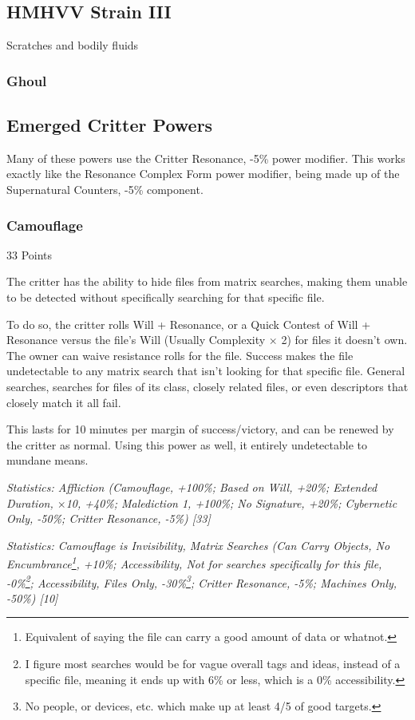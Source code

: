 \begin{multicols*}{3}
	\subsection*{HMHVV Strain III}
	
	Scratches and bodily fluids
	
	\subsubsection{Ghoul}
	
	\subsection{Emerged Critter Powers}
	
	Many of these powers use the Critter Resonance, -5\% power modifier. This works exactly like the Resonance Complex Form power modifier, being made up of the Supernatural Counters, -5\% component.
	
	\subsubsection{Camouflage}\label{camouflage}
	\begin{flushright}
		33 Points
	\end{flushright}

	The critter has the ability to hide files from matrix searches, making them unable to be detected without specifically searching for that specific file.
	
	To do so, the critter rolls Will + Resonance, or a Quick Contest of Will + Resonance versus the file's Will (Usually Complexity $\times$ 2) for files it doesn't own. The owner can waive resistance rolls for the file. Success makes the file undetectable to any matrix search that isn't looking for that specific file. General searches, searches for files of its class, closely related files, or even descriptors that closely match it all fail.
	
	This lasts for 10 minutes per margin of success/victory, and can be renewed by the critter as normal. Using this power as well, it entirely undetectable to mundane means.

	\textcolor{OliveGreen}{\textit{Statistics: Affliction (Camouflage, +100\%; Based on Will, +20\%; Extended Duration, $\times$10, +40\%; Malediction 1, +100\%; No Signature, +20\%; Cybernetic Only, -50\%; Critter Resonance, -5\%) [33]}}
	
	\textcolor{OliveGreen}{\textit{Statistics: Camouflage is Invisibility, Matrix Searches (Can Carry Objects, No Encumbrance\footnote{Equivalent of saying the file can carry a good amount of data or whatnot.}, +10\%; Accessibility, Not for searches specifically for this file, -0\%\footnote{I figure most searches would be for vague overall tags and ideas, instead of a specific file, meaning it ends up with 6\% or less, which is a 0\% accessibility.}; Accessibility, Files Only, -30\%\footnote{No people, or devices, etc. which make up at least 4/5 of good targets.}; Critter Resonance, -5\%; Machines Only, -50\%) [10] }}
	 

\end{multicols*}
